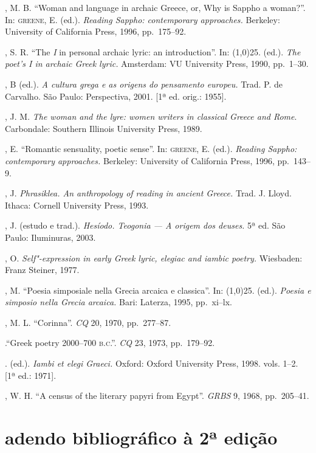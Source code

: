 \begin{bibliohedra}
, M. B. “Woman and language in archaic Greece, or, Why is Sappho
a woman?”. In: \textsc{greene}, E. (ed.). \textit{Reading Sappho: contemporary
approaches.} Berkeley: University of California Press, 1996, pp.~175--92.

, S. R. “The \textit{I} in personal archaic lyric: an
introduction”. In: \line(1,0){25}. (ed.). \textit{The poet’s I in archaic Greek
lyric.} Amsterdam: VU University Press, 1990, pp.~1--30.

, B (ed.). \textit{A cultura grega e as origens do pensamento
europeu.} Trad. P. de Carvalho. São Paulo: Perspectiva, 2001. [1ª ed. orig.:
1955].

, J. M. \textit{The woman and the lyre: women writers in
classical Greece and Rome}. Carbondale: Southern Illinois University Press,
1989.

, E. “Romantic sensuality, poetic sense”. In: \textsc{greene}, E.
(ed.). \textit{Reading Sappho: contemporary approaches.} Berkeley: University
of California Press, 1996, pp.~143--9.

, J. \textit{Phrasiklea. An anthropology of reading in ancient
Greece.} Trad. J. Lloyd. Ithaca: Cornell University Press, 1993.

, J. (estudo e trad.). \textit{Hesíodo. Teogonia --- A origem dos
deuses.} 5ª ed. São Paulo: Iluminuras, 2003.

, O. \textit{Self"-expression in early Greek lyric, elegiac
and iambic poetry.} Wiesbaden: Franz Steiner, 1977.

, M. “Poesia simposiale nella Grecia arcaica e classica”. In:
\line(1,0){25}. (ed.). \textit{Poesia e simposio nella Grecia arcaica.}
Bari: Laterza, 1995, pp.~xi--lx.

, M. L. “Corinna”. \textit{CQ} 20, 1970, pp.~277--87.

\titidem.“Greek poetry 2000--700 \textsc{b.c.”.} \textit{CQ} 23, 1973,
pp.~179--92.

\titidem. (ed.). \textit{Iambi et elegi Graeci.} Oxford: Oxford University
Press, 1998. vols. 1--2. [1ª ed.: 1971].

, W. H. “A census of the literary papyri from Egypt”.
\textit{GRBS} 9, 1968, pp.~205--41.



\section*{adendo bibliográfico à 2ª edição}



\end{bibliohedra}
